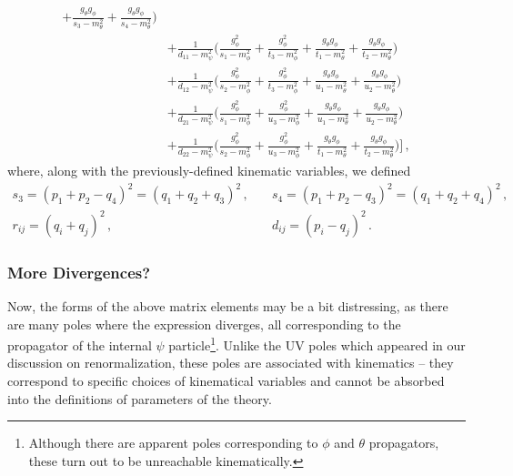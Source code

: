 \documentclass{article}
\numberwithin{equation}{subsection}
\begin{document}
\begin{align*}
	+ \frac{g_\theta g_\phi}{s_3 - m_\theta^2} + \frac{g_\theta g_\phi}{s_4 - m_\theta^2}\Bigg)
	\\[0.5em]
  &+ \frac{1}{d_{11} - m_\psi^2}\Bigg(
	\frac{g_\phi^2}{s_1 - m_\phi^2} + \frac{g_\phi^2}{t_3 - m_\phi^2}
	+ \frac{g_\theta g_\phi}{t_1 - m_\theta^2} + \frac{g_\theta g_\phi}{t_2 - m_\theta^2}\Bigg)
	\\[0.5em]
  &+ \frac{1}{d_{12} - m_\psi^2}\Bigg(
	\frac{g_\phi^2}{s_2 - m_\phi^2} + \frac{g_\phi^2}{t_3 - m_\phi^2}
	+ \frac{g_\theta g_\phi}{u_1 - m_\theta^2} + \frac{g_\theta g_\phi}{u_2 - m_\theta^2}\Bigg)
	\\[0.5em]
  &+ \frac{1}{d_{21} - m_\psi^2}\Bigg(
	\frac{g_\phi^2}{s_1 - m_\phi^2} + \frac{g_\phi^2}{u_3 - m_\phi^2}
	+ \frac{g_\theta g_\phi}{u_1 - m_\theta^2} + \frac{g_\theta g_\phi}{u_2 - m_\theta^2}\Bigg)
	\\[0.5em]
  &+ \frac{1}{d_{22} - m_\psi^2}\Bigg(
	\frac{g_\phi^2}{s_2 - m_\phi^2} + \frac{g_\phi^2}{u_3 - m_\phi^2}
	+ \frac{g_\theta g_\phi}{t_1 - m_\theta^2} + \frac{g_\theta g_\phi}{t_2 - m_\theta^2}\Bigg)
	\Bigg]
	\,,
\end{align*}
where, along with the previously-defined kinematic variables, we defined
\begin{equation}\begin{split}
 s_3 = (p_1 + p_2 - q_4)^2 = (q_1 + q_2 + q_3)^2\,, &\quad
 s_4 = (p_1 + p_2 - q_3)^2 = (q_1 + q_2 + q_4)^2\,, \\[0.5em]
 r_{ij} = (q_i + q_j)^2\,, &\quad d_{ij} = (p_i - q_j)^2 \,.
\end{split}\end{equation}

\subsubsection{More Divergences?}

Now, the forms of the above matrix elements may be a bit distressing, as there are many poles where the expression
diverges, all corresponding to the propagator of the internal $\psi$ particle\footnote{Although there are apparent
poles corresponding to $\phi$ and $\theta$ propagators, these turn out to be unreachable kinematically.}. 
Unlike the UV poles which appeared in our discussion on renormalization, these poles are associated with
kinematics -- they correspond to specific choices of kinematical variables and cannot be absorbed into the definitions
of parameters of the theory.
\end{document}
